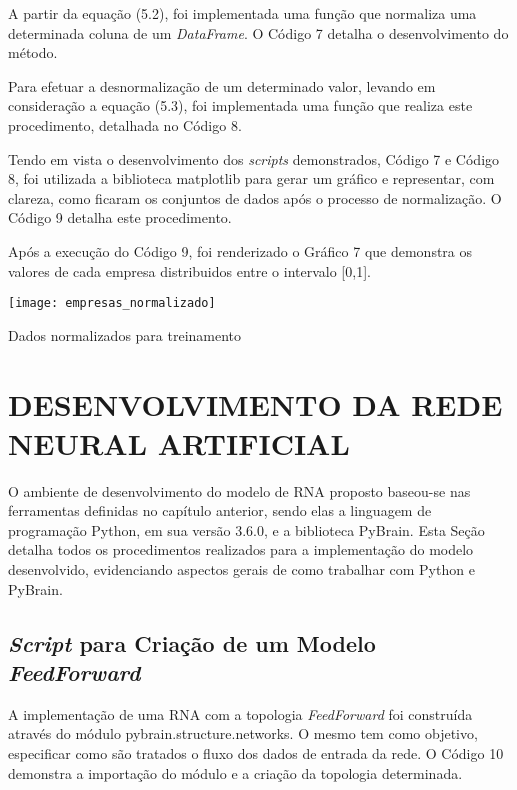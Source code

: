 A partir da equação (5.2), foi implementada uma função que normaliza uma determinada coluna de um \textit{DataFrame}. O Código 7 detalha o desenvolvimento do método.


Para efetuar a desnormalização de um determinado valor, levando em consideração a equação (5.3), foi implementada uma função que realiza este procedimento, detalhada no Código 8.
  

Tendo em vista o desenvolvimento dos \textit{scripts} demonstrados, Código 7 e Código 8, foi utilizada a biblioteca matplotlib para gerar um gráfico e representar, com clareza, como ficaram os conjuntos de dados após o processo de normalização. O Código 9 detalha este procedimento.



Após a execução do Código 9, foi renderizado o Gráfico 7 que demonstra os valores de cada empresa distribuidos entre o intervalo [0,1].

\begin{grafico}[h]
	\centering
	\centerline{\texttt{[image: empresas\_normalizado]}}
	\caption{Dados normalizados para treinamento}
	\label{exec-intel-coleta}
\end{grafico}

\section{DESENVOLVIMENTO DA REDE NEURAL ARTIFICIAL}
O ambiente de desenvolvimento do modelo de RNA proposto baseou-se nas ferramentas definidas no capítulo anterior, sendo elas a linguagem de programação Python, em sua versão 3.6.0, e a biblioteca PyBrain. Esta Seção detalha todos os procedimentos realizados para a implementação do modelo desenvolvido, evidenciando aspectos gerais de como trabalhar com Python e PyBrain.
\subsection{\textit{Script} para Criação de um Modelo \textit{FeedForward}}
A implementação de uma RNA com a topologia \textit{FeedForward} foi construída através do módulo pybrain.structure.networks. O mesmo tem como objetivo, especificar como são tratados o fluxo dos dados de entrada da rede. O Código 10 demonstra a importação do módulo e a criação da topologia determinada.

